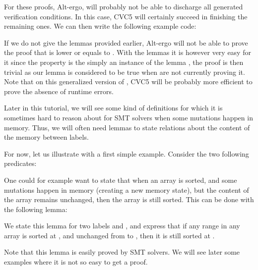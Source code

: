 


For these proofs, Alt-ergo, will probably not be able to discharge all
generated verification conditions. In this case, CVC5 will certainly succeed
in finishing the remaining ones. We can then write the following example code:






If we do not give the lemmas provided earlier, Alt-ergo will not be able
to prove the proof that  is lower or equals to
. With the lemmas it is however very easy for it since the
property is the simply an instance of the lemma
, the proof is then trivial as our lemma is
considered to be true when are not currently proving it. Note that on this
generalized version of , CVC5 will be probably more
efficient to prove the absence of runtime errors.




Later in this tutorial, we will see some kind of definitions for which it is
sometimes hard to reason about for SMT solvers when some mutations happen in
memory. Thus, we will often need lemmas to state relations about the content
of the memory between labels.


For now, let us illustrate with a first simple example. Consider the two following
predicates:




One could for example want to state that when an array is sorted, and some
mutations happen in memory (creating a new memory state), but the content of the
array remains unchanged, then the array is still sorted. This can be done with
the following lemma:




We state this lemma for two labels  and , and
express that if any range in any array is sorted at , and
unchanged from  to , then it is still sorted at
.


Note that this lemma is easily proved by SMT solvers. We will see later some
examples where it is not so easy to get a proof.




